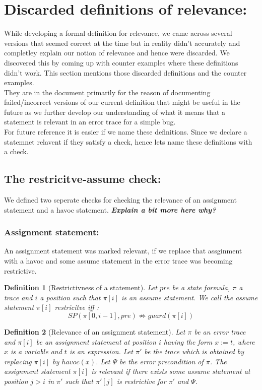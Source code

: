 \documentclass{article}
\newcommand{\limp}{\Rightarrow}
\newtheorem{mydef}{Definition}
\begin{document}
\section{Discarded definitions of relevance:}
While developing a formal definition for relevance, we came across several versions that seemed correct at the time but in reality didn't accurately and completley explain our notion of relevance and hence were discarded. We discovered this by coming up with counter examples where these definitions didn't work. This section mentions those discarded definitions and the counter examples.\\ 
They are in the document primarily for the reason of documenting failed/incorrect versions of our current definition that might be useful in the future as we further develop our understanding of what it means that a statement is relevant in an error trace for a simple bug. \\
For future reference it is easier if we name these definitions. Since we declare a statemnet relavent if they satisfy a check, hence lets name these definitions with a check.
\subsection{The restricitve-assume check:}
We defined two seperate checks for checking the relevance of an assignment statement and a havoc statement. \textbf{\textit{Explain a bit more here why?}}
\subsubsection{Assignment statement:}
An assignment statement was marked relevant, if we replace that assginment with a havoc and some assume statement in the error trace was becoming restrictive.
\begin{mydef}[Restrictivness of a statement]
Let $pre$ be a state formula, $\pi$ a trace and $i$ a position such that $\pi[i]$ is an assume statement. We call the assume statement $\pi[i]$ \emph{restricitve} iff :
$$SP(\pi[0,i-1], pre) \not \limp guard(\pi[i])$$
\end{mydef}

\begin{mydef}[Relevance of an assignment statement]
Let $\pi$ be an error trace and $\pi[i]$ be an assignment statement at position $i$ having the form $x:=t$, where $x$ is a variable and $t$ is an expression. Let $\pi'$ be the trace which is obtained by replacing $\pi[i]$ by  $havoc(x)$. Let $\Psi$ be the error precondition of $\pi$. The assignment statement $\pi[i]$ is \emph{relevant} if there exists some assume statement at position $j > i$ in $\pi'$ such that $\pi'[j]$ is restrictive for $\pi'$ and $\Psi$. 
\end{mydef}
\end{document}
